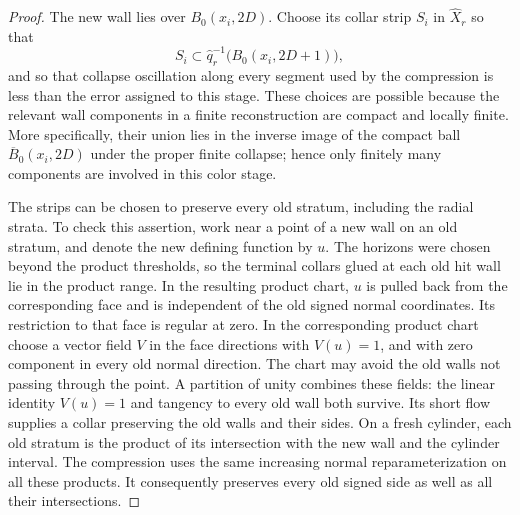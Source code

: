 \documentclass[11pt]{article}
\numberwithin{equation}{section}
\theoremstyle{definition}
\theoremstyle{remark}
\begin{document}
\begin{proof}
The new wall lies over $B_0(x_i,2D)$.  Choose its collar strip $S_i$ in
$\widehat X_r$ so that
\begin{equation}\label{topology:strip}
 S_i\subset\widehat q_r^{-1}\bigl(B_0(x_i,2D+1)\bigr),
\end{equation}
and so that collapse oscillation along every segment used by the
compression is less than the error assigned to this stage.  These
choices are possible because the relevant wall components in a finite
reconstruction are compact and locally finite.  More specifically,
their union lies in the inverse image of the compact ball
$\overline B_0(x_i,2D)$ under the proper finite collapse; hence only
finitely many components are involved in this color stage.

The strips can be chosen to preserve every old stratum, including the
radial strata.  To check this assertion, work near a point of a new wall
on an old stratum, and denote the new defining function by $u$.
The horizons were chosen beyond the product thresholds, so the terminal
collars glued at each old hit wall lie in the product range.  In the
resulting product chart, $u$ is pulled back from the corresponding face
and is independent of the old signed normal coordinates.  Its restriction
to that face is regular at zero.  In the corresponding product chart choose a vector field
$V$ in the face directions with $V(u)=1$, and with zero component in
every old normal direction.  The chart may avoid the old walls not
passing through the point.  A partition of unity combines these fields:
the linear identity $V(u)=1$ and tangency to every old wall both survive.
Its short flow supplies a collar preserving the old walls and their
sides.  On a fresh cylinder, each old stratum is the product of its
intersection with the new wall and the cylinder interval.  The
compression uses the same increasing normal reparameterization on
all these products.  It consequently preserves every old signed side
as well as all their intersections.


\end{proof}
\end{document}
